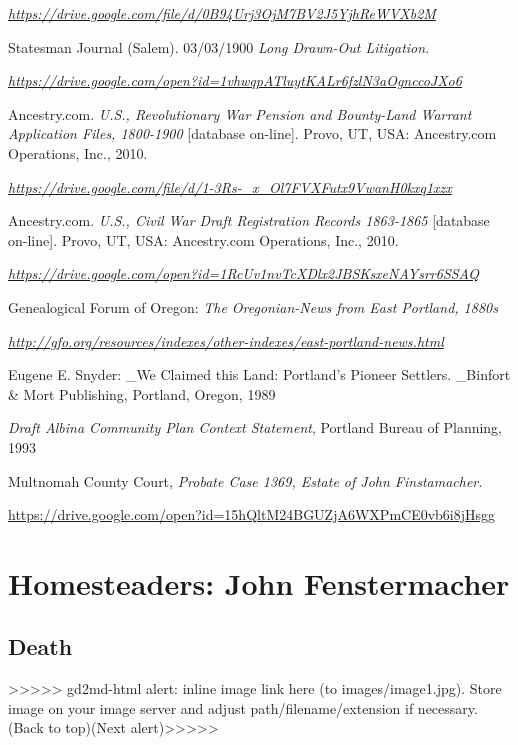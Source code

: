 \documentclass[
  12pt,
]{book}
\begin{document}
\emph{\url{https://drive.google.com/file/d/0B94Urj3OjM7BV2J5YjhReWVXb2M}}

Statesman Journal (Salem). 03/03/1900 \emph{Long Drawn-Out Litigation.}

\emph{\url{https://drive.google.com/open?id=1vhwqpATluytKALr6fzlN3aOgnccoJXo6}}

Ancestry.com. \emph{U.S., Revolutionary War Pension and Bounty-Land Warrant Application Files, 1800-1900 }{[}database on-line{]}. Provo, UT, USA: Ancestry.com Operations, Inc., 2010.

\emph{\url{https://drive.google.com/file/d/1-3Rs-_x_Ol7FVXFutx9VwanH0kxq1xzx}}

Ancestry.com. \emph{U.S., Civil War Draft Registration Records 1863-1865 }{[}database on-line{]}. Provo, UT, USA: Ancestry.com Operations, Inc., 2010.

\emph{\url{https://drive.google.com/open?id=1RcUv1nvTcXDlx2JBSKsxeNAYsrr6SSAQ}}

Genealogical Forum of Oregon: \emph{The Oregonian-News from East Portland, 1880s}

\emph{\url{http://gfo.org/resources/indexes/other-indexes/east-portland-news.html}}

Eugene E. Snyder: \_We Claimed this Land: Portland's Pioneer Settlers. \_Binfort \& Mort Publishing, Portland, Oregon, 1989

\emph{Draft Albina Community Plan Context Statement}, Portland Bureau of Planning, 1993

Multnomah County Court, \emph{Probate Case 1369, Estate of John Finstamacher.}

\url{https://drive.google.com/open?id=15hQltM24BGUZjA6WXPmCE0vb6i8jHsgg}

\hypertarget{homesteaders-john-fenstermacher}{%
\section{Homesteaders: John Fenstermacher}\label{homesteaders-john-fenstermacher}}

\hypertarget{death-1}{%
\subsection{Death}\label{death-1}}

{\textgreater\textgreater\textgreater\textgreater\textgreater{} gd2md-html alert: inline image link here (to images/image1.jpg). Store image on your image server and adjust path/filename/extension if necessary. }(Back to top)(Next alert){\textgreater\textgreater\textgreater\textgreater\textgreater{} }
\end{document}
